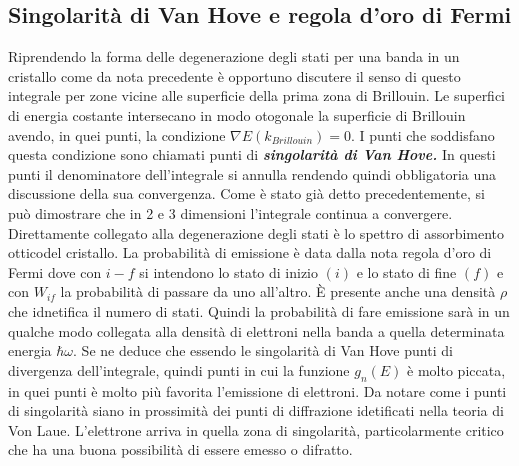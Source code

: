 \subsection{Singolarità di Van Hove e regola d'oro di Fermi}
Riprendendo la forma delle degenerazione degli stati per una banda in un cristallo 
come da nota precedente è opportuno discutere il senso di questo integrale per zone vicine alle superficie della prima zona di Brillouin. Le superfici di energia costante intersecano in modo otogonale la superficie di Brillouin avendo, in quei punti, la condizione $\nabla E(k_{Brillouin}) =0$. I punti che soddisfano questa condizione sono chiamati punti di \textit{\textbf{singolarità di Van Hove.}} In questi punti il denominatore dell'integrale si annulla rendendo quindi obbligatoria una discussione della sua convergenza. Come è stato già detto precedentemente, si può dimostrare che in 2 e 3 dimensioni l'integrale continua a convergere. Direttamente collegato alla degenerazione degli stati è lo spettro di assorbimento otticodel cristallo. La probabilità di emissione è data dalla nota regola d'oro di Fermi
dove con $i-f$ si intendono lo stato di inizio $(i)$ e lo stato di fine $(f)$ e con $W_{if}$ la probabilità di passare da uno all'altro. \`E presente anche una densità $\rho$ che idnetifica il numero di stati. Quindi la probabilità di fare emissione sarà in un qualche modo collegata alla densità di elettroni nella banda a quella determinata energia $\hbar\omega$. Se ne deduce che essendo le singolarità di Van Hove punti di divergenza dell'integrale, quindi punti in cui la funzione $g_n(E)$ è molto piccata, in quei punti è molto più favorita l'emissione di elettroni. Da notare come i punti di singolarità siano in prossimità dei punti di diffrazione idetificati nella teoria di Von Laue. L'elettrone arriva in quella zona di singolarità, particolarmente critico che ha una buona possibilità di essere emesso o difratto.

\begin{center}
\end{center}

